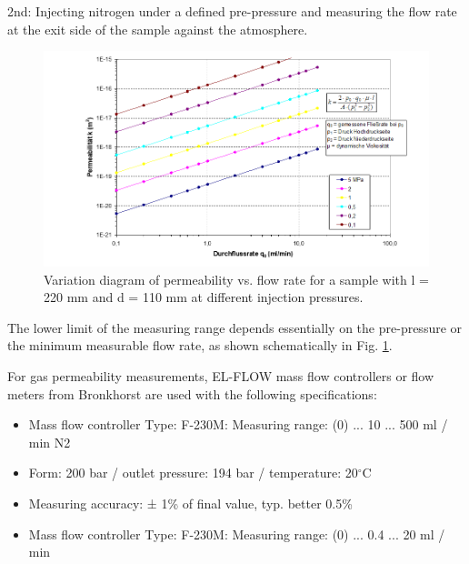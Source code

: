 2nd: Injecting nitrogen under a defined pre-pressure and measuring the flow rate at the exit side of the sample against the atmosphere.

\begin{figure}[!ht]
\centering
\includegraphics[width=1\textwidth]{./figures/ifg-perme-flowrate.png}
\caption{Variation diagram of permeability vs. flow rate for a sample with l = 220 mm and d = 110 mm at different injection pressures.}
\label{fig:ifgpermeflow}
\end{figure}

The lower limit of the measuring range depends essentially on the pre-pressure or the minimum measurable flow rate, as shown 
schematically in Fig. \ref{fig:ifgpermeflow}.

For gas permeability measurements, EL-FLOW mass flow controllers or flow meters from Bronkhorst are used with the following specifications:

\begin{itemize}
\item Mass flow controller Type: F-230M: Measuring range: (0) ... 10 ... 500 ml / min N2
\item Form: 200 bar / outlet pressure: 194 bar / temperature: 20$^\circ$C
\item Measuring accuracy: ± 1\% of final value, typ. better 0.5\%
\item Mass flow controller Type: F-230M: Measuring range: (0) ... 0.4 ... 20 ml / min
\end{itemize}





